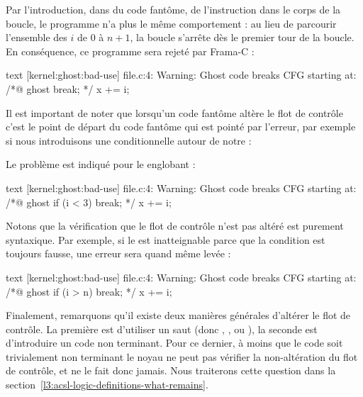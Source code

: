 

Par l'introduction, dans du code fantôme, de l'instruction  dans
le corps de la boucle, le programme n'a plus le même comportement : au lieu de
parcourir l'ensemble des $i$ de $0$ à $n+1$, la boucle s'arrête dès le premier
tour de la boucle. En conséquence, ce programme sera rejeté par Frama-C :


\begin{CodeBlock}{text}
[kernel:ghost:bad-use] file.c:4: Warning:
  Ghost code breaks CFG starting at:
  /*@ ghost break; */
  x += i;
\end{CodeBlock}


Il est important de noter que lorsqu'un code fantôme altère le flot de contrôle
c'est le point de départ du code fantôme qui est pointé par l'erreur, par exemple
si nous introduisons une conditionnelle autour de notre  :




Le problème est indiqué pour le  englobant :


\begin{CodeBlock}{text}
[kernel:ghost:bad-use] file.c:4: Warning:
  Ghost code breaks CFG starting at:
  /*@ ghost if (i < 3) break; */
  x += i;
\end{CodeBlock}


Notons que la vérification que le flot de contrôle n'est pas altéré est purement
syntaxique. Par exemple, si le  est inatteignable parce que la
condition est toujours fausse, une erreur sera quand même levée :




\begin{CodeBlock}{text}
[kernel:ghost:bad-use] file.c:4: Warning:
  Ghost code breaks CFG starting at:
  /*@ ghost if (i > n) break; */
  x += i;
\end{CodeBlock}


Finalement, remarquons qu'il existe deux manières générales d'altérer le flot de
contrôle. La première est d'utiliser un saut (donc ,
, ou ), la seconde est d'introduire un code
non terminant. Pour ce dernier, à moins que le code soit trivialement non terminant
le noyau ne peut pas vérifier la non-altération du flot de contrôle, et ne le fait
donc jamais. Nous traiterons cette question dans la
section~\ref{l3:acsl-logic-definitions-what-remains}.


